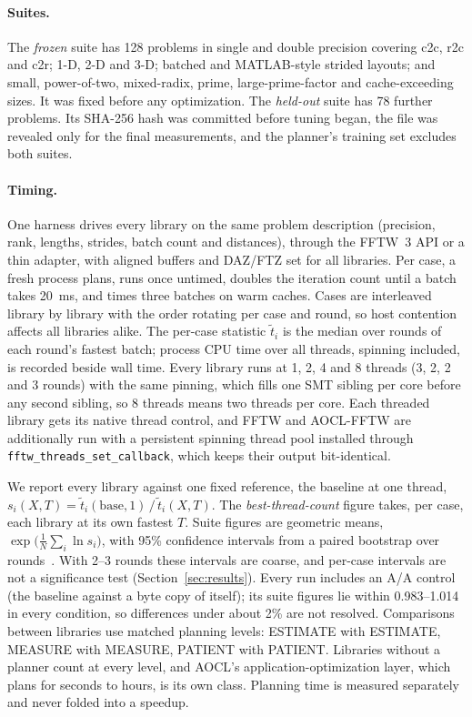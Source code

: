 \documentclass[10pt]{article}
\theoremstyle{definition}
\begin{document}
\paragraph{Suites.} The \emph{frozen} suite has 128 problems in single and double precision covering c2c, r2c and c2r; 1-D, 2-D and 3-D; batched and MATLAB-style strided layouts; and small, power-of-two, mixed-radix, prime, large-prime-factor and cache-exceeding sizes. It was fixed before any optimization. The \emph{held-out} suite has 78 further problems. Its SHA-256 hash was committed before tuning began, the file was revealed only for the final measurements, and the planner's training set excludes both suites.

\paragraph{Timing.} One harness drives every library on the same problem description (precision, rank, lengths, strides, batch count and distances), through the FFTW~3 API or a thin adapter, with aligned buffers and DAZ/FTZ set for all libraries. Per case, a fresh process plans, runs once untimed, doubles the iteration count until a batch takes 20~ms, and times three batches on warm caches. Cases are interleaved library by library with the order rotating per case and round, so host contention affects all libraries alike. The per-case statistic $\tilde t_i$ is the median over rounds of each round's fastest batch; process CPU time over all threads, spinning included, is recorded beside wall time. Every library runs at 1, 2, 4 and 8 threads (3, 2, 2 and 3 rounds) with the same pinning, which fills one SMT sibling per core before any second sibling, so 8 threads means two threads per core. Each threaded library gets its native thread control, and FFTW and AOCL-FFTW are additionally run with a persistent spinning thread pool installed through \texttt{fftw\_threads\_set\_callback}, which keeps their output bit-identical.

We report every library against one fixed reference, the baseline at one thread, $s_i(X,T)=\tilde t_i(\mathrm{base},1)\,/\,\tilde t_i(X,T)$. The \emph{best-thread-count} figure takes, per case, each library at its own fastest $T$. Suite figures are geometric means, $\exp\big(\tfrac1N\sum_i\ln s_i\big)$, with 95\% confidence intervals from a paired bootstrap over rounds~\cite{efron1993bootstrap}. With 2--3 rounds these intervals are coarse, and per-case intervals are not a significance test (Section~\ref{sec:results}). Every run includes an A/A control (the baseline against a byte copy of itself); its suite figures lie within 0.983--1.014 in every condition, so differences under about 2\% are not resolved. Comparisons between libraries use matched planning levels: ESTIMATE with ESTIMATE, MEASURE with MEASURE, PATIENT with PATIENT. Libraries without a planner count at every level, and AOCL's application-optimization layer, which plans for seconds to hours, is its own class. Planning time is measured separately and never folded into a speedup.
\end{document}
